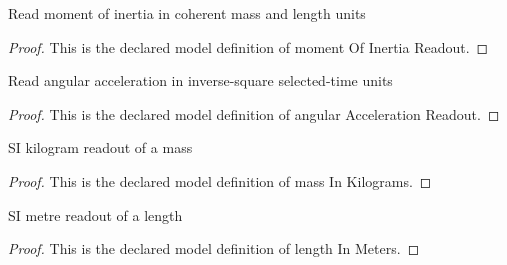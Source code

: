 \begin{definition}
  \label{def:physics:phyx-mini-0783:phyxminiproblems-problemphyxmini0783-momentofinertiareadout}
  Read moment of inertia in coherent mass and length units
\end{definition}
\begin{proof}
  This is the declared model definition of moment Of Inertia Readout.
\end{proof}
\begin{definition}
  \label{def:physics:phyx-mini-0783:phyxminiproblems-problemphyxmini0783-angularaccelerationreadout}
  Read angular acceleration in inverse-square selected-time units
\end{definition}
\begin{proof}
  This is the declared model definition of angular Acceleration Readout.
\end{proof}
\begin{definition}
  \label{def:physics:phyx-mini-0783:phyxminiproblems-problemphyxmini0783-massinkilograms}
  SI kilogram readout of a mass
\end{definition}
\begin{proof}
  This is the declared model definition of mass In Kilograms.
\end{proof}
\begin{definition}
  \label{def:physics:phyx-mini-0783:phyxminiproblems-problemphyxmini0783-lengthinmeters}
  SI metre readout of a length
\end{definition}
\begin{proof}
  This is the declared model definition of length In Meters.
\end{proof}
